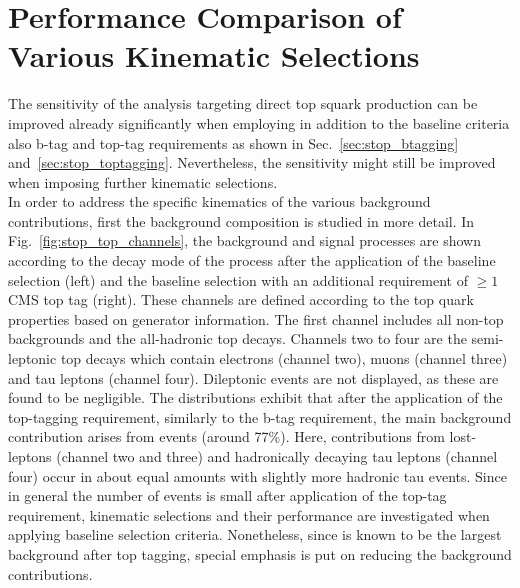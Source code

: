 \section{Performance Comparison of Various Kinematic Selections}
\label{sec:stop_cuts}
The sensitivity of the analysis targeting direct top squark production can be improved already significantly when employing in addition to the baseline criteria also b-tag and top-tag requirements as shown in Sec.~\ref{sec:stop_btagging} and~\ref{sec:stop_toptagging}. Nevertheless, the sensitivity might still be improved when imposing further kinematic selections. \\
In order to address the specific kinematics of the various background contributions, first the background composition is studied in more detail. In Fig.~\ref{fig:stop_top_channels}, the background and signal processes are shown according to the decay mode of the process after the application of the baseline selection (left) and the baseline selection with an additional requirement of $\ge 1$ CMS top tag (right). These channels are defined according to the top quark properties based on generator information. The first channel includes all non-top backgrounds and the all-hadronic top decays. Channels two to four are the semi-leptonic top decays which contain electrons (channel two), muons (channel three) and tau leptons (channel four). Dileptonic \ttbar events are not displayed, as these are found to be negligible. The distributions exhibit that after the application of the top-tagging requirement, similarly to the b-tag requirement, the main background contribution arises from \ttbar events (around 77\%). Here, contributions from lost-leptons (channel two and three) and hadronically decaying tau leptons (channel four) occur in about equal amounts with slightly more hadronic tau events. Since in general the number of events is small after application of the top-tag requirement, kinematic selections and their performance are investigated when applying baseline selection criteria. Nonetheless, since \ttbar is known to be the largest background after top tagging, special emphasis is put on reducing the \ttbar background contributions.
